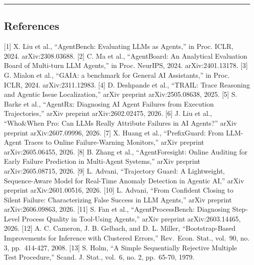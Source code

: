 \documentclass[
]{article}
\begin{document}
\begin{center}\rule{0.5\linewidth}{0.5pt}\end{center}

\subsection{References}\label{references}

{[}1{]} X. Liu et al., ``AgentBench: Evaluating LLMs as Agents,'' in
Proc. ICLR, 2024. arXiv:2308.03688. {[}2{]} C. Ma et al., ``AgentBoard:
An Analytical Evaluation Board of Multi-turn LLM Agents,'' in Proc.
NeurIPS, 2024. arXiv:2401.13178. {[}3{]} G. Mialon et al., ``GAIA: a
benchmark for General AI Assistants,'' in Proc. ICLR, 2024.
arXiv:2311.12983. {[}4{]} D. Deshpande et al., ``TRAIL: Trace Reasoning
and Agentic Issue Localization,'' arXiv preprint arXiv:2505.08638, 2025.
{[}5{]} S. Barke et al., ``AgentRx: Diagnosing AI Agent Failures from
Execution Trajectories,'' arXiv preprint arXiv:2602.02475, 2026. {[}6{]}
J. Liu et al., ``Who\&When Pro: Can LLMs Really Attribute Failures in AI
Agents?'' arXiv preprint arXiv:2607.09996, 2026. {[}7{]} X. Huang et
al., ``PrefixGuard: From LLM-Agent Traces to Online Failure-Warning
Monitors,'' arXiv preprint arXiv:2605.06455, 2026. {[}8{]} B. Zhang et
al., ``AgentForesight: Online Auditing for Early Failure Prediction in
Multi-Agent Systems,'' arXiv preprint arXiv:2605.08715, 2026. {[}9{]} L.
Advani, ``Trajectory Guard: A Lightweight, Sequence-Aware Model for
Real-Time Anomaly Detection in Agentic AI,'' arXiv preprint
arXiv:2601.00516, 2026. {[}10{]} L. Advani, ``From Confident Closing to
Silent Failure: Characterizing False Success in LLM Agents,'' arXiv
preprint arXiv:2606.09863, 2026. {[}11{]} S. Fan et al.,
``AgentProcessBench: Diagnosing Step-Level Process Quality in Tool-Using
Agents,'' arXiv preprint arXiv:2603.14465, 2026. {[}12{]} A. C. Cameron,
J. B. Gelbach, and D. L. Miller, ``Bootstrap-Based Improvements for
Inference with Clustered Errors,'' Rev.~Econ. Stat., vol.~90, no. 3,
pp.~414-427, 2008. {[}13{]} S. Holm, ``A Simple Sequentially Rejective
Multiple Test Procedure,'' Scand. J. Stat., vol.~6, no. 2, pp.~65-70,
1979.
\end{document}

